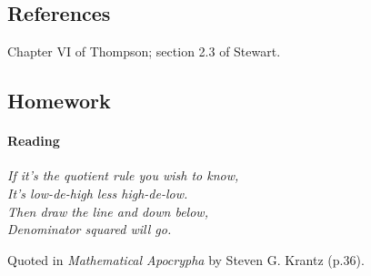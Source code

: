 \subsection{References}
Chapter VI of Thompson; section 2.3 of Stewart.

\subsection{Homework}
\paragraph{Reading}
\begin{center}\itshape
  If it's the quotient rule you wish to know,\\
  It's low-de-high less high-de-low.\\
  Then draw the line and down below,\\
  Denominator squared will go.
\end{center}

\begin{flushright}
  Quoted in \textit{Mathematical Apocrypha} by Steven G. Krantz (p.36).
\end{flushright}

